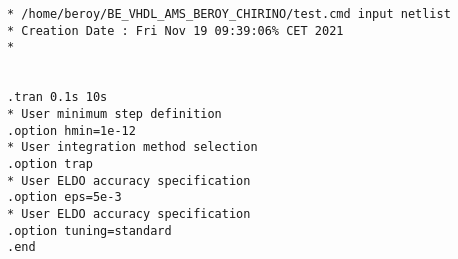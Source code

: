 \begin{verbatim}
* /home/beroy/BE_VHDL_AMS_BEROY_CHIRINO/test.cmd input netlist
* Creation Date : Fri Nov 19 09:39:06% CET 2021 
*


.tran 0.1s 10s
* User minimum step definition
.option hmin=1e-12
* User integration method selection
.option trap
* User ELDO accuracy specification
.option eps=5e-3
* User ELDO accuracy specification
.option tuning=standard
.end
\end{verbatim}